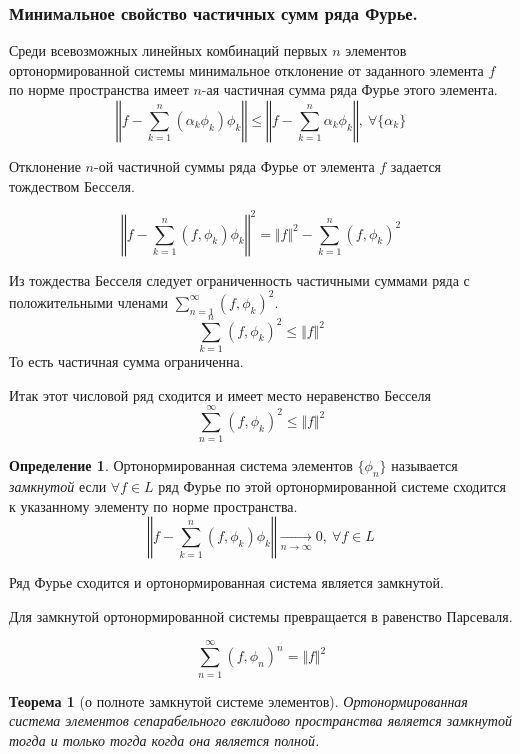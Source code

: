 \documentclass[14pt,a4paper]{extarticle}
\newtheorem{theorem}{Теорема}[section]
\theoremstyle{definition}
\newtheorem{definition}{Определение}[section]
\theoremstyle{remark}
\renewcommand{\[}{\begin{dmath*}[compact]}
\renewcommand{\]}{\end{dmath*}}
\newcommand{\sep}{ , \ \allowbreak }
\begin{document}
\subsubsection{Минимальное свойство частичных сумм ряда Фурье.}

Среди всевозможных линейных комбинаций первых $n$ элементов
ортонормированной системы минимальное отклонение от заданного
элемента $f$ по норме пространства имеет $n$-ая частичная сумма
ряда Фурье этого элемента.
\[ \left\Vert f - \sum_{k=1}^n (\alpha_k \phi_k) \phi_k \right \Vert
\leq \left \Vert f - \sum_{k=1}^n \alpha_k \phi_k \right \Vert \sep
{\forall \{\alpha_k\}}\]

Отклонение $n$-ой частичной суммы ряда Фурье от элемента $f$ задается
тождеством Бесселя.

\[\left \Vert f - \sum_{k=1}^n (f,\phi_k) \phi_k \right \Vert ^ 2
= \Vert f \Vert ^ 2 - \sum_{k=1}^n(f,\phi_k)^2 \]

Из тождества Бесселя следует ограниченность частичными
суммами ряда с положительными членами $\sum_{n=1}^\infty (f,\phi_k)^2$.
\[\sum_{k=1}^n (f,\phi_k)^2 \leq \Vert f \Vert ^2 \]
То есть частичная сумма ограниченна.

Итак этот числовой ряд сходится и имеет место неравенство Бесселя
\[\sum_{n=1}^\infty (f,\phi_k)^2 \leq \Vert f \Vert ^2\]

\begin{definition}
  Ортонормированная система элементов $\{\phi_n\}$ называется
  \textit{замкнутой} если
  $\forall f \in L$ ряд Фурье по этой ортонормированной системе сходится
  к указанному элементу по норме пространства.
  \[\left \Vert f - \sum_{k=1}^n (f,\phi_k) \phi_k \right \Vert
  \xrightarrow[n \to \infty]{} 0 \sep \forall f\in L\]
\end{definition}

Ряд Фурье сходится и ортонормированная система является замкнутой.

Для замкнутой ортонормированной системы превращается в равенство Пар\-се\-валя.

\[\sum_{n=1}^\infty (f, \phi_n)^n = \Vert f \Vert ^2\]

\begin{theorem}[о полноте замкнутой системе элементов]
  Ортонормированная система элементов сепарабельного евклидово пространства
  является замкнутой тогда и только тогда когда она является полной.
\end{theorem}
\end{document}
